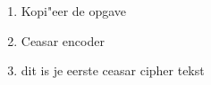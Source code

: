 \begin{enumerate}
  \item Kopi"eer de opgave
  \item Ceasar encoder
  \item dit is je eerste ceasar cipher tekst
\end{enumerate}